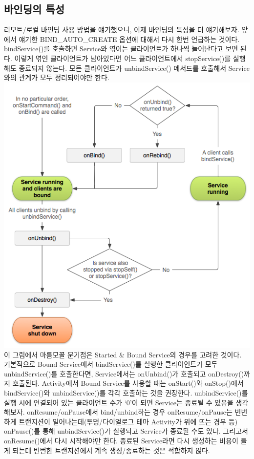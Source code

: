\subsection{바인딩의 특성}
\label{subsec:binding_special}
리모트/로컬 바인딩 사용 방법을 얘기했으니, 이제 바인딩의 특성을 더 얘기해보자. 앞에서 얘기한 BIND\_AUTO\_CREATE 옵션에 대해서 다시 한번 언급하는 것이다. 
bindService()를 호출하면 Service와 엮이는 클라이언트가 하나씩 늘어난다고 보면 된다. 
이렇게 엮인 클라이언트가 남아있다면 어느 클라이언트에서 stopService()를 실행해도 종료되지 않는다. 모든 클라이언트가 unbindService() 메서드를 호출해서 Service와의 관계가 모두 정리되어야만 한다.\\
\includegraphics[scale=0.5]{service-binding-tree-lifecycle}\\
이 그림에서 마름모꼴 분기점은 Started \& Bound Service의 경우를 고려한 것이다.\\

기본적으로 Bound Service에서 bindService()를 실행한 클라이언트가 모두 unbindService()를 호출한다면, Service에서는 onUnbind()가 호출되고 onDestroy()까지 호출된다.
Activity에서 Bound Service를 사용할 때는 onStart()와 onStop()에서 bindService()와 unbindService()를 각각 호출하는 것을 권장한다. 
unbindService()를 실행 시에 연결되어 있는 클라이언트 수가 `0'이 되면 Service는 종료될 수 있음을 생각해보자. onResume/onPause에서 bind/unbind하는 경우 onResume/onPause는 빈번하게 트랜지션이 일어나는데(투명/다이얼로그 테마 Activity가 위에 뜨는 경우 등) onPause()를 통해 unbindService()가 실행되고 Service가 종료될 수도 있다. 
그리고서 onResume()에서 다시 시작해야만 한다. 종료된 Service라면 다시 생성하는 비용이 들게 되는데 빈번한 트랜지션에서 계속 생성/종료하는 것은 적합하지 않다.\\

